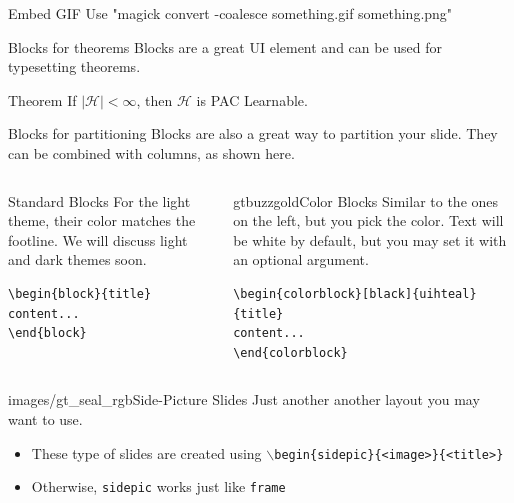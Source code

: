 \documentclass{beamer}
\begin{document}
\begin{frame}{Embed GIF}
    Use "magick convert -coalesce something.gif something.png"
    
    \centering
\end{frame}


\begin{frame}[fragile]{Blocks for theorems}
Blocks are a great UI element and can be used for typesetting theorems.
\begin{block}{Theorem}
If $\mid \mathcal{H} \mid < \infty$, then $\mathcal{H}$ is PAC Learnable.
\end{block}
\end{frame}


\begin{frame}[fragile]{Blocks for partitioning}
Blocks are also a great way to partition your slide. They can be combined with columns, as shown here.
\begin{columns}
\begin{column}{0.3\textwidth}
\begin{block}{Standard Blocks}
For the light theme, their color matches the footline. We will discuss light and dark themes soon.
\begin{verbatim}
\begin{block}{title}
content...
\end{block}
\end{verbatim}
\end{block}
\end{column}
\begin{column}{0.7\textwidth}
\begin{colorblock}[black]{gtbuzzgold}{Color Blocks}
Similar to the ones on the left, but you pick the color. Text will be white by 
default, but you may set it with an optional argument.
\small
\begin{verbatim}
\begin{colorblock}[black]{uihteal}{title}
content...
\end{colorblock}
\end{verbatim}
\end{colorblock}
\end{column}
\end{columns}
\end{frame}


\begin{sidepic}{images/gt_seal_rgb}{Side-Picture Slides}
Just another another layout you may want to use.
\begin{itemize}
\item These type of slides are created using \texttt{$\backslash$begin\{sidepic\}\{<image>\}\{<title>\}}
\item Otherwise, \texttt{sidepic} works just like \texttt{frame}
\end{itemize}
\end{sidepic}
\end{document}
